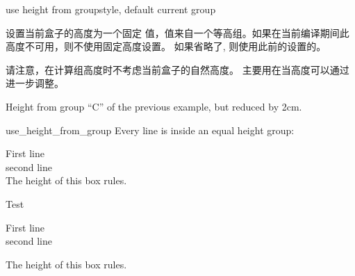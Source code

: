 \begin{docTcbKey}[][doc new and updated={2015-11-27}{2016-02-22}]{use height from group}{}{style, default current group}

设置当前盒子的高度为一个固定  值，值来自一个等高组。如果在当前编译期间此高度不可用，则不使用固定高度设置。
如果省略了, 则使用此前的设置的。\par
请注意，在计算组高度时不考虑当前盒子的自然高度。
主要用在当高度可以通过  进一步调整。

\begin{dispExample}
\begin{tcolorbox}[use height from group=C,add to height=-2cm,
  colframe=blue!75!black,colback=white]
Height from group \enquote{C} of the previous example, but reduced by 2cm.
\end{tcolorbox}%
\end{dispExample}

\begin{exdispExample}[runs=2]{use_height_from_group}
Every line is inside an equal height group:
\begin{tcbraster}[raster equal height=rows,
    title=Box \thetcbrasternum,
    enhanced,size=small,colframe=red!50!black,colback=red!10!white]
  \begin{tcolorbox}First line\\second line\\
    The height of this box rules.\end{tcolorbox}
  \begin{tcolorbox}Test\end{tcolorbox}
  \begin{tcolorbox}
    First line\\second line\end{tcolorbox}
  \begin{tcolorbox}The height of this box rules.\end{tcolorbox}
\end{tcbraster}
\end{exdispExample}
\end{docTcbKey}



